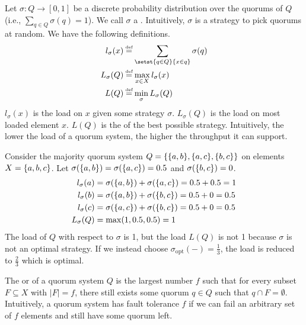 
Let $\sigma: Q \to [0, 1]$ be a discrete probability distribution over the
quorums of $Q$ (i.e., $\sum_{q \in Q} \sigma(q) = 1$). We call $\sigma$ a
. Intuitively, $\sigma$ is a strategy to pick quorums at
random. We have the following definitions.
\begin{align*}
  l_\sigma(x) &\defeq \sum_{\setst{q \in Q}{x \in q}} \sigma(q) \\
  L_\sigma(Q) &\defeq \max_{x \in X} l_\sigma(x) \\
  L(Q)        &\defeq \min_\sigma L_\sigma(Q)
\end{align*}
$l_\sigma(x)$ is the load on $x$ given some strategy $\sigma$. $L_\sigma(Q)$ is
the load on most loaded element $x$. $L(Q)$ is the  of the best
possible strategy. Intuitively, the lower the load of a quorum system, the
higher the throughput it can support.

\begin{example}
  Consider the majority quorum system $Q = \{\{a, b\}, \{a, c\}, \{b,
  c\}\}$ on elements $X = \{a, b, c\}$. Let $\sigma(\{a, b\}) =
  \sigma(\{a, c\}) = 0.5$ and $\sigma(\{b, c\}) = 0$.
  \begin{align*}
    l_\sigma(a) &= \sigma(\{a, b\}) + \sigma(\{a, c\}) = 0.5 + 0.5 = 1 \\
    l_\sigma(b) &= \sigma(\{a, b\}) + \sigma(\{b, c\}) = 0.5 + 0 = 0.5 \\
    l_\sigma(c) &= \sigma(\{a, c\}) + \sigma(\{b, c\}) = 0.5 + 0 = 0.5 \\
    L_\sigma(Q) &= \max(1, 0.5, 0.5) = 1
  \end{align*}
  The load of $Q$ with respect to $\sigma$ is 1, but the load $L(Q)$ is not 1
  because $\sigma$ is not an optimal strategy. If we instead choose
  $\sigma_{\text{opt}}(-) = \frac{1}{3}$, the load is reduced to $\frac{2}{3}$
  which is optimal.
\end{example}

The  or  of a quorum system $Q$ is
the largest number $f$ such that for every subset $F \subseteq X$ with $|F| =
f$, there still exists some quorum $q \in Q$ such that $q \cap F = \emptyset$.
Intuitively, a quorum system has fault tolerance $f$ if we can fail an
arbitrary set of $f$ elements and still have some quorum left.
